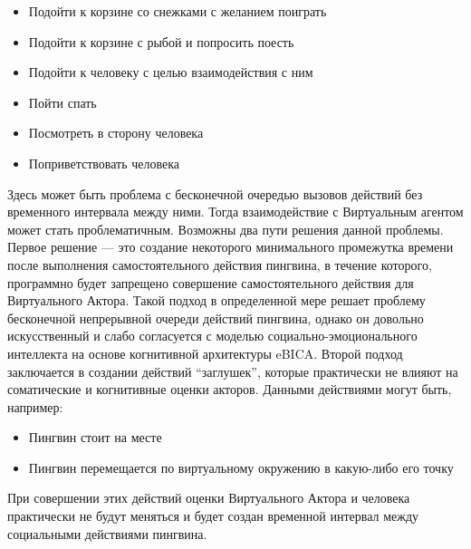 \begin{itemize}
  \item Подойти к корзине со снежками с желанием поиграть
  \item Подойти к корзине с рыбой и попросить поесть
  \item Подойти к человеку с целью взаимодействия с ним
  \item Пойти спать
  \item Посмотреть в сторону человека
  \item Поприветствовать человека
\end{itemize}
  
Здесь может быть проблема с бесконечной очередью вызовов действий без временного интервала между ними. Тогда взаимодействие с Виртуальным агентом может стать проблематичным. Возможны два пути решения данной проблемы. Первое решение — это создание некоторого минимального промежутка времени после выполнения самостоятельного действия пингвина, в течение которого, программно будет запрещено совершение самостоятельного действия для Виртуального Актора. Такой подход в определенной мере решает проблему бесконечной непрерывной очереди действий пингвина, однако он довольно искусственный и слабо согласуется с моделью социально-эмоционального интеллекта на основе когнитивной архитектуры eBICA. Второй подход заключается в создании действий “заглушек”, которые практически не влияют на соматические и когнитивные оценки акторов. Данными действиями могут быть, например:
\begin{itemize}
\item Пингвин стоит на месте
\item Пингвин перемещается по виртуальному окружению в какую-либо его точку
\end{itemize}

При совершении этих действий оценки Виртуального Актора и человека практически не будут меняться и будет создан временной интервал между социальными действиями пингвина. 

